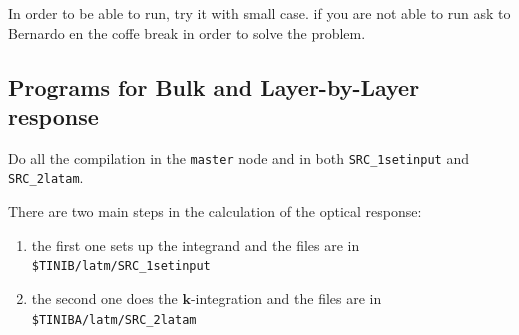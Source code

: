 \documentclass[12pt,leqno]{article}
\numberwithin{equation}{section}
\begin{document}
In order to be able to run, try it with small case. 
if you are not able to run ask to Bernardo en the coffe 
break in order to solve the problem. 

\subsection{Programs for Bulk and Layer-by-Layer response}
\label{sec:programs}

Do all the compilation in the \verb=master= node and in both 
\verb=SRC_1setinput=
and
\verb=SRC_2latam=.

There are two main steps in the calculation of the optical response:

\begin{enumerate}

\item the first one sets up the integrand and the
files are in\\
\verb=$TINIB/latm/SRC_1setinput=
\item the second one does the $\mathbf{k}$-integration and the files
  are in\\
\verb=$TINIBA/latm/SRC_2latam=
\end{enumerate}
\end{document}
